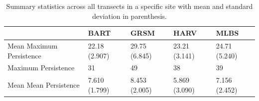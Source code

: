 \documentclass[10pt]{article}
\begin{document}
\begin{table}[]
\centering
\caption{Summary statistics across all transects in a specific site with mean and standard deviation in parenthesis.}
\begin{tabular}{|l|l|l|l|l|}
\hline
                         & BART          & GRSM          & HARV          & MLBS          \\ \hline
Mean Maximum Persistence & 22.18 (2.907) & 29.75 (6.845) & 23.21 (3.141) & 24.71 (5.240) \\ \hline
Maximum Persistence      & 31            & 49            & 38            & 39            \\ \hline
Mean Mean Persistence    & 7.610 (1.799) & 8.453 (2.005) & 5.869 (3.090) & 7.156 (2.452) \\ \hline
\end{tabular}
\end{table}
\end{document}
